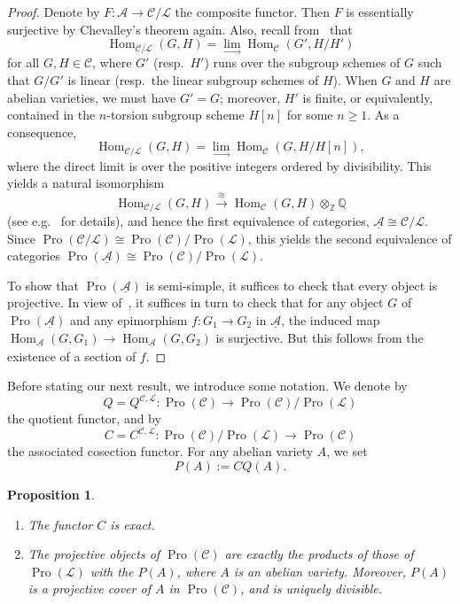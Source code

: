 \documentclass[11pt]{article}
\newtheorem{prop}[theo]{Proposition}
\theoremstyle{definition}
\numberwithin{equation}{section}
\newcommand\bQ{{\mathbb Q}}
\newcommand\bZ{{\mathbb Z}}
\newcommand\cA{{\mathcal A}}
\newcommand\cC{{\mathcal C}}
\newcommand\cL{{\mathcal L}}
\newcommand\ucA{\underline{\mathcal A}}
\DeclareMathOperator{\Hom}{Hom}
\DeclareMathOperator{\Pro}{Pro}
\theoremstyle{remark}
\newcommand*{\romanenumi}{}%
\begin{document}
\begin{proof}
Denote by $F : \cA \to \cC/\cL$ the composite functor. Then $F$ is essentially surjective by Chevalley's theorem again. Also, recall from~\cite[III.1]{Gabriel} that
\[
\Hom_{\cC/\cL}(G,H) = \lim_{\to} \Hom_{\cC}(G',H/H')
\]
for all $G,H \in \cC$, where $G'$ (resp.~$H'$) runs over the subgroup schemes of $G$ such that $G/G'$ is linear (resp.~the linear subgroup schemes of $H$). When $G$ and $H$ are abelian varieties, we must have $G' = G$; moreover, $H'$ is finite, or equivalently, contained in the $n$-torsion subgroup scheme $H[n]$ for some $n \geq 1$. As a consequence,
\[
\Hom_{\cC/\cL}(G,H) = \lim_{\to} \Hom_{\cC}(G,H/H[n]),
\]
where the direct limit is over the positive integers ordered by divisibility. This yields a natural isomorphism
\[
\Hom_{\cC/\cL}(G,H) \stackrel{\cong}{\longrightarrow}
\Hom_{\cC}(G,H) \otimes_{\bZ} \bQ
\]
(see e.g.~\cite[Prop.~3.6]{Br17a} for details), and hence the first equivalence of categories, $\ucA \cong \cC/\cL$. Since $\Pro(\cC/\cL) \cong \Pro(\cC)/\Pro(\cL)$, this yields the second equivalence of categories $\Pro(\ucA) \cong \Pro(\cC)/\Pro(\cL)$.

To show that $\Pro(\ucA)$ is semi-simple, it suffices to check that every object is projective. In view of~\cite[V.2.3.5]{DG}, it suffices in turn to check that for any object $G$ of $\Pro(\ucA)$ and any epimorphism $f: G_1 \to G_2$ in $\ucA$, the induced map $\Hom_{\ucA}(G,G_1) \to \Hom_{\ucA}(G,G_2)$ is surjective. But this follows from the existence of a section of $f$.
\end{proof}

Before stating our next result, we introduce some notation. We denote by
\[
Q = Q^{\cC,\cL} :
\Pro(\cC) \longrightarrow \Pro(\cC)/\Pro(\cL)
\]
the quotient functor, and by
\[
C = C^{\cC,\cL} :
\Pro(\cC)/\Pro(\cL) \longrightarrow \Pro(\cC)
\]
the associated cosection functor. For any abelian variety $A$, we set
\[
P(A) := CQ(A).
\]

\begin{prop}\label{prop:affine}\ 
\begin{enumerate}\romanenumi
\item \label{3.3.1} The functor $C$ is exact.
\item \label{3.3.2} The projective objects of $\Pro(\cC)$ are exactly the products of those of $\Pro(\cL)$ with the $P(A)$, where $A$ is an abelian variety. Moreover, $P(A)$ is a projective cover of $A$ in $\Pro(\cC)$, and is uniquely divisible.
\end{enumerate}
\end{prop}
\end{document}
